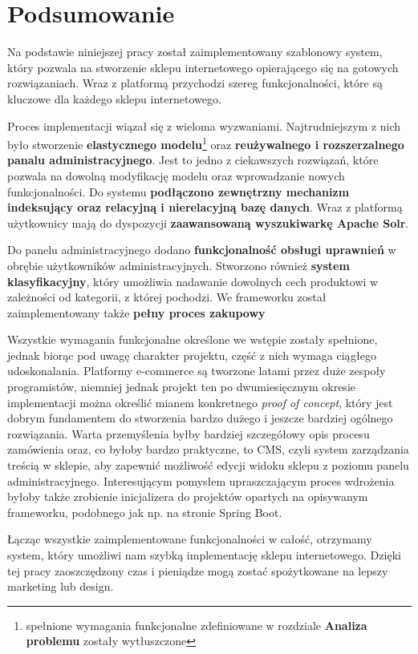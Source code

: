 \chapter{Podsumowanie}
\thispagestyle{chapterBeginStyle}

Na podstawie niniejszej pracy został zaimplementowany szablonowy system, który pozwala na stworzenie sklepu internetowego opierającego się na gotowych rozwiązaniach. Wraz z platformą przychodzi szereg funkcjonalności, które są kluczowe dla każdego sklepu internetowego. 

Proces implementacji wiązał się z wieloma wyzwaniami. Najtrudniejszym z nich było stworzenie \textbf{elastycznego modelu}\footnote{spełnione wymagania funkcjonalne zdefiniowane w rozdziale \textbf{Analiza problemu} zostały wytłuszczone} oraz \textbf{reużywalnego i rozszerzalnego panalu administracyjnego}. Jest to jedno z ciekawszych rozwiązań, które pozwala na dowolną modyfikację modelu oraz wprowadzanie nowych funkcjonalności. Do systemu \textbf{podłączono zewnętrzny mechanizm indeksujący oraz relacyjną i nierelacyjną bazę danych}. Wraz z platformą użytkownicy mają do dyspozycji \textbf{zaawansowaną wyszukiwarkę Apache Solr}.

Do panelu administracyjnego dodano \textbf{funkcjonalność obsługi uprawnień} w obrębie użytkowników administracyjnych. Stworzono również \textbf{system klasyfikacyjny}, który umożliwia nadawanie dowolnych cech produktowi w zależności od kategorii, z której pochodzi. We frameworku został zaimplementowany także \textbf{pełny proces zakupowy} 

Wszystkie wymagania funkcjonalne określone we wstępie zostały spełnione, jednak biorąc pod uwagę charakter projektu, część z nich wymaga ciągłego udoskonalania. Platformy e-commerce są tworzone latami przez duże zespoły programistów, niemniej jednak projekt ten po dwumiesięcznym okresie implementacji można określić mianem konkretnego \textit{proof of concept}, który jest dobrym fundamentem do stworzenia bardzo dużego i jeszcze bardziej ogólnego rozwiązania. Warta przemyślenia byłby bardziej szczegółowy opis procesu zamówienia oraz, co byłoby bardzo praktyczne, to CMS, czyli system zarządzania treścią w sklepie, aby zapewnić możliwość edycji widoku sklepu z poziomu panelu administracyjnego. Interesującym pomysłem upraszczającym proces wdrożenia byłoby także zrobienie inicjalizera do projektów opartych na opisywanym frameworku, podobnego jak np. na stronie Spring Boot. 

Łącząc wszystkie zaimplementowane funkcjonalności w całość, otrzymamy system, który umożliwi nam szybką implementację sklepu internetowego. Dzięki tej pracy zaoszczędzony czas i pieniądze mogą zostać spożytkowane na lepszy marketing lub design.  
